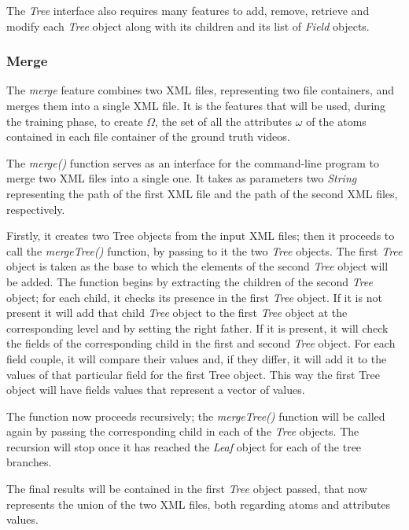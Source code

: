The \emph{Tree} interface also requires many features to add, remove, retrieve and modify each \emph{Tree} object along with its children and its list of \emph{Field} objects.

\subsubsection{Merge}

The \emph{merge} feature combines two XML files, representing two file containers, and merges them into a single XML file. It is the features that will be used, during the training phase, to create $\Omega$, the set of all the attributes $\omega$ of the atoms contained in each file container of the ground truth videos.

The \emph{merge()} function serves as an interface for the command-line program to merge two XML files into a single one. It takes as parameters two \emph{String} representing the path of the first XML file and the path of the second XML files, respectively.

Firstly, it creates two Tree objects from the input XML files; then it proceeds to call the \emph{mergeTree()} function, by passing to it the two \emph{Tree} objects. The first \emph{Tree} object is taken as the base to which the elements of the second \emph{Tree} object will be added. The function begins by extracting the children of the second \emph{Tree} object; for each child, it checks its presence in the first \emph{Tree} object.
If it is not present it will add that child \emph{Tree} object to the first \emph{Tree} object at the corresponding level and by setting the right father.
If it is present, it will check the fields of the corresponding child in the first and second \emph{Tree} object. For each field couple, it will compare their values and, if they differ, it will add it to the values of that particular field for the first Tree object. This way the first Tree object will have fields values that represent a vector of values.

The function now proceeds recursively; the \emph{mergeTree()} function will be called again by passing the corresponding child in each of the \emph{Tree} objects. The recursion will stop once it has reached the \emph{Leaf} object for each of the tree branches.

The final results will be contained in the first \emph{Tree} object passed, that now represents the union of the two XML files, both regarding atoms and attributes values.

